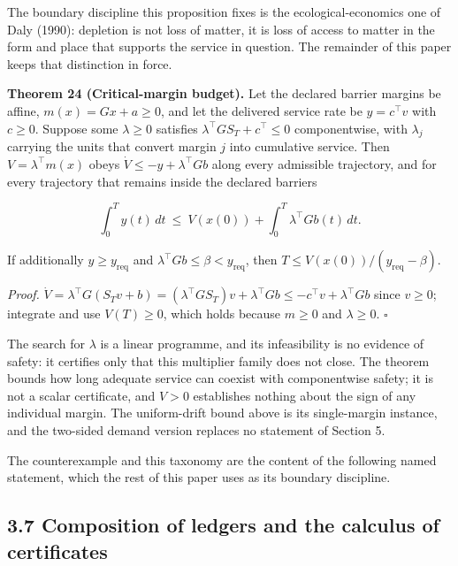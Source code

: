 \documentclass[11pt]{article}
\begin{document}
The boundary discipline this proposition fixes is the ecological-economics one of Daly (1990): depletion is not loss of matter, it is loss of access to matter in the form and place that supports the service in question. The remainder of this paper keeps that distinction in force.

\textbf{Theorem 24 (Critical-margin budget).} Let the declared barrier margins be affine, \(m(x)=Gx+a\ge0\), and let the delivered service rate be \(y=c^{\top}v\) with \(c\ge0\). Suppose some \(\lambda\ge0\) satisfies \(\lambda^{\top}GS_T+\allowbreak{}c^{\top}\le0\) componentwise, with \(\lambda_j\) carrying the units that convert margin \(j\) into cumulative service. Then \(V=\lambda^{\top}m(x)\) obeys \(\dot V\le-y+\lambda^{\top}Gb\) along every admissible trajectory, and for every trajectory that remains inside the declared barriers 

$$\int_0^Ty(t)\,dt\ \le\ V(x(0))+\int_0^T\lambda^{\top}Gb(t)\,dt .$$

 If additionally \(y\ge y_{\mathrm{req}}\) and \(\lambda^{\top}Gb\le\beta<y_{\mathrm{req}}\), then \(T\le V(x(0))/(y_{\mathrm{req}}-\beta)\).

\emph{Proof.} \(\dot V=\allowbreak{}\lambda^{\top}G(S_Tv+\allowbreak{}b)=\allowbreak{}(\lambda^{\top}GS_T)v+\allowbreak{}\lambda^{\top}Gb\le -c^{\top}v+\allowbreak{}\lambda^{\top}Gb\) since \(v\ge0\); integrate and use \(V(T)\ge0\), which holds because \(m\ge0\) and \(\lambda\ge0\). \(\square\)

The search for \(\lambda\) is a linear programme, and its infeasibility is no evidence of safety: it certifies only that this multiplier family does not close. The theorem bounds how long adequate service can coexist with componentwise safety; it is not a scalar certificate, and \(V>0\) establishes nothing about the sign of any individual margin. The uniform-drift bound above is its single-margin instance, and the two-sided demand version replaces no statement of Section 5.

\vspace{0.8em}

The counterexample and this taxonomy are the content of the following named statement, which the rest of this paper uses as its boundary discipline.

\subsection*{3.7 Composition of ledgers and the calculus of certificates}\label{37-composition-of-ledgers-and-the-calculus-of-certificates}
\end{document}
